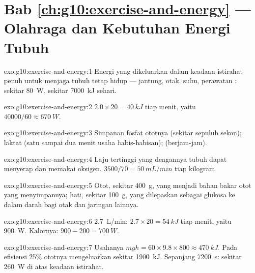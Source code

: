 \section*{Bab \ref{ch:g10:exercise-and-energy} --- Olahraga dan Kebutuhan Energi Tubuh}

\begin{solution}{exo:g10:exercise-and-energy:1}
Energi yang dikeluarkan dalam keadaan istirahat penuh untuk menjaga
tubuh tetap hidup --- jantung, otak, suhu, perawatan : sekitar
\qty{80}{W}, sekitar \qty{7000}{kJ} sehari.
\end{solution}

\begin{solution}{exo:g10:exercise-and-energy:2}
$2.0 \times 20 = \qty{40}{kJ}$ tiap menit, yaitu $40000/60 \approx
\qty{670}{W}$.
\end{solution}

\begin{solution}{exo:g10:exercise-and-energy:3}
Simpanan fosfat ototnya (sekitar sepuluh sekon);  laktat
(satu sampai dua menit usaha habis-habisan);  (berjam-jam).
\end{solution}

\begin{solution}{exo:g10:exercise-and-energy:4}
Laju tertinggi yang dengannya tubuh dapat menyerap dan memakai oksigen.
$3500/70 = \qty{50}{mL/min}$ tiap kilogram.
\end{solution}

\begin{solution}{exo:g10:exercise-and-energy:5}
Otot, sekitar \qty{400}{g}, yang menjadi bahan bakar otot yang
menyimpannya; hati, sekitar \qty{100}{g}, yang dilepaskan sebagai
glukosa ke dalam darah bagi otak dan jaringan lainnya.
\end{solution}

\begin{solution}{exo:g10:exercise-and-energy:6}
\qty{2.7}{L/min}: $2.7 \times 20 = \qty{54}{kJ}$ tiap menit, yaitu
\qty{900}{W}. Kalornya: $900 - 200 = \qty{700}{W}$.
\end{solution}

\begin{solution}{exo:g10:exercise-and-energy:7}
Usahanya $mgh = 60 \times 9.8 \times 800 \approx \qty{470}{kJ}$. Pada
efisiensi 25\% ototnya mengeluarkan sekitar \qty{1900}{kJ}. Sepanjang
\qty{7200}{s}: sekitar \qty{260}{W} di atas keadaan istirahat.
\end{solution}


